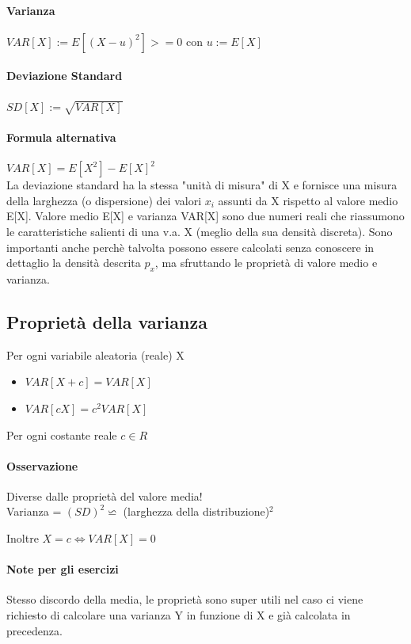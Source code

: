 \documentclass[12pt, a4paper, openany]{book}
\begin{document}
\paragraph{Varianza} $VAR[X] := E[(X-u)^2] >= 0$ con $u:=E[X]$
\paragraph{Deviazione Standard} $SD[X] := \sqrt{VAR[X]}$
\paragraph{Formula alternativa} $VAR[X] = E[X^2] - E[X]^2$
\\ La deviazione standard ha la stessa "unità di misura" di X e fornisce 
una misura della larghezza (o dispersione) dei valori $x_i$ assunti da X rispetto
al valore medio E[X].
Valore medio E[X] e varianza VAR[X] sono due numeri reali che riassumono
le caratteristiche salienti di una v.a. X (meglio della sua densità discreta).
Sono importanti anche perchè talvolta possono essere calcolati
senza conoscere in dettaglio la densità descrita $p_x$, ma sfruttando le
proprietà di valore medio e varianza.

\subsection{Proprietà della varianza}
Per ogni variabile aleatoria (reale) X
\begin{itemize}
    \item $VAR[X+c] = VAR[X]$
    \item $VAR[cX] = c^2 VAR[X]$
\end{itemize}
Per ogni costante reale $c \in R$
\paragraph{Osservazione} Diverse dalle proprietà del valore media!
\\ Varianza = $(SD)^2 \backsimeq $ (larghezza della distribuzione)$^2$
\begin{center}
    Inoltre $X = c \Leftrightarrow VAR[X] = 0$
\end{center}

\paragraph*{Note per gli esercizi} Stesso discordo della media, le proprietà sono super
utili nel caso ci viene richiesto di calcolare una varianza Y in funzione di X e già
calcolata in precedenza.
\end{document}
